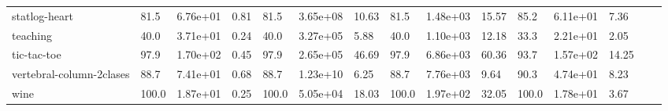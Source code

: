 \begin{table}
\begin{tabular}{lllllllllllllll}
			statlog-heart                     & 81.5     & 6.76e+01 & 0.81 & 81.5     & 3.65e+08 & 10.63  & 81.5     & 1.48e+03 & 15.57  & 85.2     & 6.11e+01 & 7.36  &   & \\
			teaching                          & 40.0     & 3.71e+01 & 0.24 & 40.0     & 3.27e+05 & 5.88   & 40.0     & 1.10e+03 & 12.18  & 33.3     & 2.21e+01 & 2.05  &   & \\
			tic-tac-toe                       & 97.9     & 1.70e+02 & 0.45 & 97.9     & 2.65e+05 & 46.69  & 97.9     & 6.86e+03 & 60.36  & 93.7     & 1.57e+02 & 14.25 &   & \\
			vertebral-column-2clases          & 88.7     & 7.41e+01 & 0.68 & 88.7     & 1.23e+10 & 6.25   & 88.7     & 7.76e+03 & 9.64   & 90.3     & 4.74e+01 & 8.23  &   & \\
			wine                              & 100.0    & 1.87e+01 & 0.25 & 100.0    & 5.05e+04 & 18.03  & 100.0    & 1.97e+02 & 32.05  & 100.0    & 1.78e+01 & 3.67  &   &
		\end{tabular}
	\end{table}


